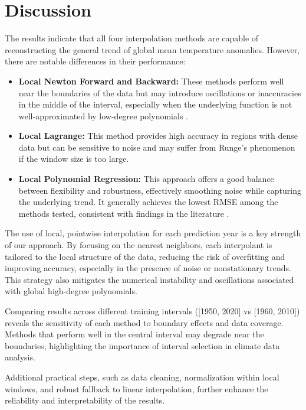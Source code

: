 \section{Discussion}

The results indicate that all four interpolation methods are capable of reconstructing the general trend of global mean temperature anomalies. However, there are notable differences in their performance:

\begin{itemize}
    \item \textbf{Local Newton Forward and Backward:} These methods perform well near the boundaries of the data but may introduce oscillations or inaccuracies in the middle of the interval, especially when the underlying function is not well-approximated by low-degree polynomials \cite{atkinson1989introduction}.
    \item \textbf{Local Lagrange:} This method provides high accuracy in regions with dense data but can be sensitive to noise and may suffer from Runge's phenomenon if the window size is too large.
    \item \textbf{Local Polynomial Regression:} This approach offers a good balance between flexibility and robustness, effectively smoothing noise while capturing the underlying trend. It generally achieves the lowest RMSE among the methods tested, consistent with findings in the literature \cite{brown2021polynomial}.
\end{itemize}

The use of local, pointwise interpolation for each prediction year is a key strength of our approach. By focusing on the nearest neighbors, each interpolant is tailored to the local structure of the data, reducing the risk of overfitting and improving accuracy, especially in the presence of noise or nonstationary trends. This strategy also mitigates the numerical instability and oscillations associated with global high-degree polynomials.

Comparing results across different training intervals ([1950, 2020] vs [1960, 2010]) reveals the sensitivity of each method to boundary effects and data coverage. Methods that perform well in the central interval may degrade near the boundaries, highlighting the importance of interval selection in climate data analysis.

Additional practical steps, such as data cleaning, normalization within local windows, and robust fallback to linear interpolation, further enhance the reliability and interpretability of the results.